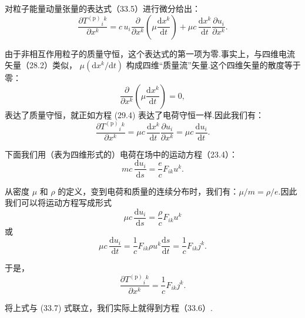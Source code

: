 对粒子能量动量张量的表达式（33.5）进行微分给出：
\begin{equation*}
  \frac{\partial {T^{(\mathrm{p})}}_i{}^k}{\partial x^k}
  =c\,u_i\frac{\partial}{\partial x^k}
  \left(\mu\frac{\mathrm{d}x^k}{\mathrm{d}t}\right)
  +\mu c\,\frac{\mathrm{d}x^k}{\mathrm{d}t}
  \frac{\partial u_i}{\partial x^k}.
\end{equation*}

由于非相互作用粒子的质量守恒，这个表达式的第一项为零.事实上，与四维电流矢量（28.2）类似，
$\mu(\mathrm{d}x^k/\mathrm{d}t)$ 构成四维“质量流”矢量.这个四维矢量的散度等于零：
\begin{equation}
  \frac{\partial}{\partial x^k}
  \left(\mu\frac{\mathrm{d}x^k}{\mathrm{d}t}\right)=0,
\end{equation}
表达了质量守恒，就正如方程 (29.4) 表达了电荷守恒一样.因此我们有：
\begin{equation*}
  \frac{\partial {T^{(\mathrm{p})}}_i{}^k}{\partial x^k}
  =\mu c\,\frac{\mathrm{d}x^k}{\mathrm{d}t}
  \frac{\partial u_i}{\partial x^k}
  =\mu c\,\frac{\mathrm{d}u_i}{\mathrm{d}t}.
\end{equation*}

下面我们用（表为四维形式的）电荷在场中的运动方程（23.4）：
\begin{equation*}
  mc\,\frac{\mathrm{d}u_i}{\mathrm{d}s}=\frac{e}{c}F_{ik}u^k.
\end{equation*}

从密度 $\mu$ 和 $\rho$ 的定义，变到电荷和质量的连续分布时，我们有：$\mu/m=\rho/e$.因此我们可以将运动方程写成形式
\begin{equation*}
  \mu c\,\frac{\mathrm{d}u_i}{\mathrm{d}s}
  =\frac{\rho}{c}F_{ik}u^k
\end{equation*}
或
\begin{equation*}
  \mu c\,\frac{\mathrm{d}u_i}{\mathrm{d}t}
  =\frac{1}{c}F_{ik}\rho u^k\frac{\mathrm{d}s}{\mathrm{d}t}
  =\frac{1}{c}F_{ik}j^k.
\end{equation*}

于是，
\begin{equation}
  \frac{\partial {T^{(\mathrm{p})}}_i{}^k}{\partial x^k}
  =\frac{1}{c}F_{ik}j^k.
\end{equation}

将上式与 (33.7) 式联立，我们实际上就得到方程（33.6）.

